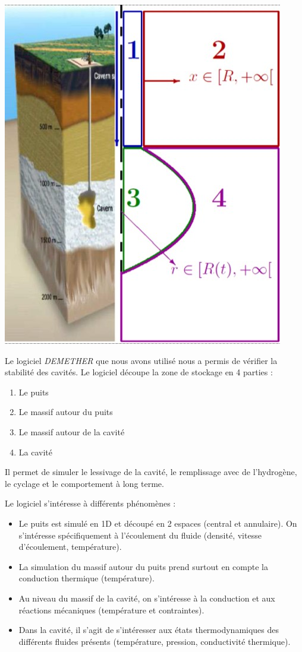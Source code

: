 \documentclass[11pt,french,a4paper]{article}
\begin{document}
\begin{multicols}{2}


\begin{center}
\includegraphics[width=.9\linewidth]{image/chap2/schema_cav.jpg}
\end{center}

Le logiciel \emph{DEMETHER} que nous avons utilisé nous a permis de vérifier la stabilité des cavités. Le logiciel découpe la zone de stockage en 4 parties : 
\begin{enumerate}
\item Le puits
\item Le massif autour du puits
\item Le massif autour de la cavité
\item La cavité
\end{enumerate}
Il permet de simuler le lessivage de la cavité, le remplissage avec de l'hydrogène, le cyclage et le comportement à long terme.

Le logiciel s'intéresse à différents phénomènes : 
\begin{itemize}
\item Le puits est simulé en 1D et découpé en 2 espaces (central et annulaire). On s’intéresse spécifiquement à l’écoulement du fluide (densité, vitesse d’écoulement, température).
\item La simulation du massif autour du puits prend surtout en compte la conduction thermique (température).
\item Au niveau du massif de la cavité, on s’intéresse à la conduction et aux réactions mécaniques (température et contraintes).
\item Dans la cavité, il s’agit de s’intéresser aux états thermodynamiques des différents fluides présents (température, pression, conductivité thermique).
\end{itemize}


\end{multicols}
\end{document}
